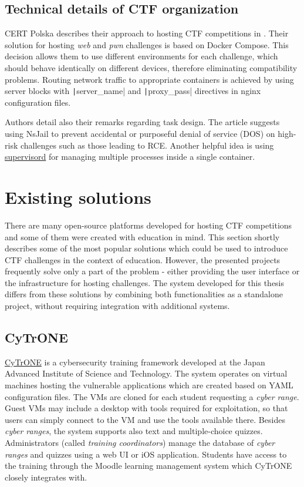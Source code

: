 \subsection{Technical details of CTF organization}

CERT Polska describes their approach to hosting CTF competitions in \cite{bib:hack.cert.pl}. Their solution for hosting \textit{web} and \textit{pwn} challenges is based on Docker Compose. This decision allows them to use different environments for each challenge, which should behave identically on different devices, therefore eliminating compatibility problems. Routing network traffic to appropriate containers is achieved by using server blocks with \texttt|server_name| and \texttt|proxy_pass| directives in nginx configuration files.

Authors detail also their remarks regarding task design. The article suggests using NsJail to prevent accidental or purposeful denial of service (DOS) on high-risk challenges such as those leading to RCE. Another helpful idea is using \href{https://github.com/Supervisor/supervisor}{supervisord} for managing multiple processes inside a single container.

\section{Existing solutions}
\label{sec:existing-solutions}

There are many open-source platforms developed for hosting CTF competitions and some of them were created with education in mind. This section shortly describes some of the most popular solutions which could be used to introduce CTF challenges in the context of education. However, the presented projects frequently solve only a part of the problem - either providing the user interface or the infrastructure for hosting challenges. The system developed for this thesis differs from these solutions by combining both functionalities as a standalone project, without requiring integration with additional systems.

\subsection{CyTrONE}

\href{https://github.com/crond-jaist/cytrone}{CyTrONE} \cite{bib:cytrone} is a cybersecurity training framework developed at the Japan Advanced Institute of Science and Technology. The system operates on virtual machines hosting the vulnerable applications which are created based on YAML configuration files. The VMs are cloned for each student requesting a \textit{cyber range}. Guest VMs may include a desktop with tools required for exploitation, so that users can simply connect to the VM and use the tools available there. Besides \textit{cyber ranges}, the system supports also text and multiple-choice quizzes. Administrators (called \textit{training coordinators}) manage the database of \textit{cyber ranges} and quizzes using a web UI or iOS application. Students have access to the training through the Moodle learning management system which CyTrONE closely integrates with.

